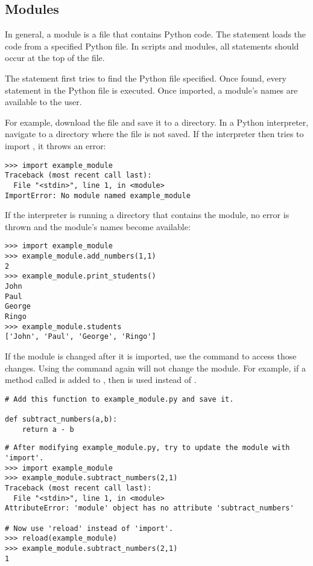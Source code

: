 \subsection*{Modules}

In general, a module is a file that contains Python code.
The  statement loads the code from a specified Python file.
In scripts and modules, all  statements should occur at the top of the file.

The  statement first tries to find the Python file specified.
Once found, every statement in the Python file is executed.
Once imported, a module's names are available to the user.

For example, download the file  and save it to a directory.
In a Python interpreter, navigate to a directory where the file is not saved.
If the interpreter then tries to import , it throws an error:

\begin{lstlisting}
>>> import example_module
Traceback (most recent call last):
  File "<stdin>", line 1, in <module>
ImportError: No module named example_module
\end{lstlisting}

If the interpreter is running a directory that contains the module, no error is thrown and the module's names become available:

\begin{lstlisting}
>>> import example_module
>>> example_module.add_numbers(1,1)
2
>>> example_module.print_students()
John
Paul
George
Ringo
>>> example_module.students
['John', 'Paul', 'George', 'Ringo']
\end{lstlisting}

If the module is changed after it is imported, use the  command to access those changes.
Using the  command again will not change the module.
For example, if a method called  is added to , then  is used instead of .

\begin{lstlisting}
# Add this function to example_module.py and save it.

def subtract_numbers(a,b):
	return a - b
\end{lstlisting}

\begin{lstlisting}
# After modifying example_module.py, try to update the module with 'import'.
>>> import example_module
>>> example_module.subtract_numbers(2,1)
Traceback (most recent call last):
  File "<stdin>", line 1, in <module>
AttributeError: 'module' object has no attribute 'subtract_numbers'

# Now use 'reload' instead of 'import'.
>>> reload(example_module)
>>> example_module.subtract_numbers(2,1)
1
\end{lstlisting}

